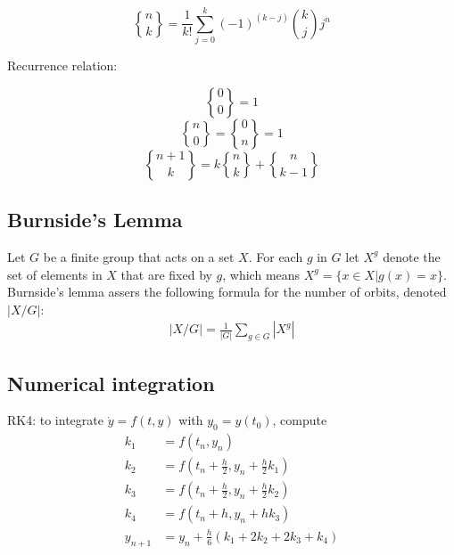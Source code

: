 \documentclass[portrait, 8pt, a4paper, oneside, twocolumn]{extarticle}
\begin{document}
$${n \brace k}=\frac{1}{k!}\sum_{j=0}^{k}(-1)^{(k-j)}{k \choose j}j^n$$

Recurrence relation:

$${0 \brace 0}=1$$
$${n \brace 0}={0 \brace n}=1$$
$${n+1 \brace k}=k{n \brace k}+{n \brace k-1}$$


\subsection{Burnside's Lemma}
Let $G$ be a finite group that acts on a set $X$. For each $g$ in $G$ let $X^g$ denote the set of elements in $X$ that are fixed by $g$, which means $X^g=\{x\in X| g(x)=x\}$. Burnside's lemma assers the following formula for the number of orbits, denoted $|X/G|$:
\begin{align*}
	|X/G|=\frac{1}{|G|} \sum_{g\in G} |X^g|
\end{align*}

\subsection{Numerical integration}
RK4: to integrate $\dot{y} = f(t, y)$ with $y_0 = y(t_0)$, compute
\begin{align*}
	k_1 &= f(t_n, y_n) \\
	k_2 &= f(t_n + \frac h 2, y_n + \frac h 2 k_1) \\
	k_3 &= f(t_n + \frac h 2, y_n + \frac h 2 k_2) \\
	k_4 &= f(t_n + h, y_n + h k_3) \\
	y_{n+1} &= y_n + \frac h 6 (k_1 + 2k_2 + 2k_3 + k_4) 
\end{align*}
\end{document}
